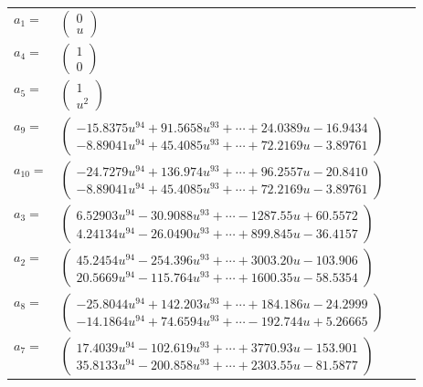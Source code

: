 \documentclass[1p]{elsarticle_modified}
\theoremstyle{definition}
\begin{document}
\begin{tabular}{m{7pt} m{180pt} m{7pt} m{180pt} }
\flushright $a_{1}=$&$\begin{pmatrix}0\\u\end{pmatrix}$ \\
\flushright $a_{4}=$&$\begin{pmatrix}1\\0\end{pmatrix}$ \\
\flushright $a_{5}=$&$\begin{pmatrix}1\\u^2\end{pmatrix}$ \\
\flushright $a_{9}=$&$\begin{pmatrix}-15.8375 u^{94}+91.5658 u^{93}+\cdots+24.0389 u-16.9434\\-8.89041 u^{94}+45.4085 u^{93}+\cdots+72.2169 u-3.89761\end{pmatrix}$ \\
\flushright $a_{10}=$&$\begin{pmatrix}-24.7279 u^{94}+136.974 u^{93}+\cdots+96.2557 u-20.8410\\-8.89041 u^{94}+45.4085 u^{93}+\cdots+72.2169 u-3.89761\end{pmatrix}$ \\
\flushright $a_{3}=$&$\begin{pmatrix}6.52903 u^{94}-30.9088 u^{93}+\cdots-1287.55 u+60.5572\\4.24134 u^{94}-26.0490 u^{93}+\cdots+899.845 u-36.4157\end{pmatrix}$ \\
\flushright $a_{2}=$&$\begin{pmatrix}45.2454 u^{94}-254.396 u^{93}+\cdots+3003.20 u-103.906\\20.5669 u^{94}-115.764 u^{93}+\cdots+1600.35 u-58.5354\end{pmatrix}$ \\
\flushright $a_{8}=$&$\begin{pmatrix}-25.8044 u^{94}+142.203 u^{93}+\cdots+184.186 u-24.2999\\-14.1864 u^{94}+74.6594 u^{93}+\cdots-192.744 u+5.26665\end{pmatrix}$ \\
\flushright $a_{7}=$&$\begin{pmatrix}17.4039 u^{94}-102.619 u^{93}+\cdots+3770.93 u-153.901\\35.8133 u^{94}-200.858 u^{93}+\cdots+2303.55 u-81.5877\end{pmatrix}$ \\

\end{tabular}
\end{document}
